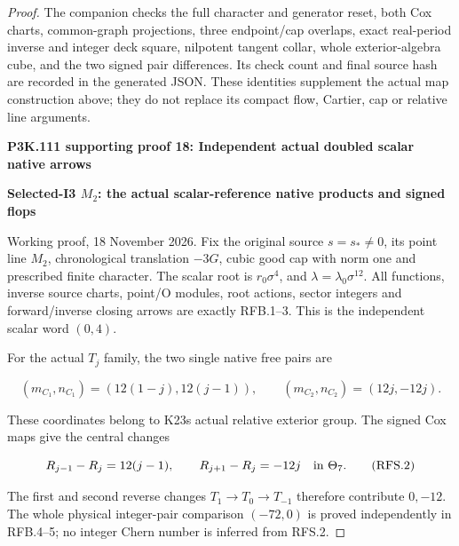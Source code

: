 \begin{proof}
The companion 
checks the full character and generator reset, both Cox charts,
common-graph projections, three endpoint/cap overlaps, exact
real-period inverse and integer deck square, nilpotent tangent
collar, whole exterior-algebra cube, and the two signed pair
differences. Its check count and final source hash are recorded in
the generated JSON. These identities supplement the actual map
construction above; they do not replace its compact flow,
Cartier, cap or relative line arguments.




\par\bigskip\noindent\textbf{P3K.111 supporting proof 18: Independent actual doubled scalar native arrows}\par\nobreak
\par

\medskip\noindent\textbf{Selected-I3 \(M_{2}\): the actual scalar-reference native products and signed flops}

\par\nobreak

Working proof, 18 November 2026. Fix the original source \(s=s_*\ne0\),
its point line \(M_2\), chronological translation \(-3G\), cubic
good cap with norm one and prescribed finite character. The scalar
root is \(r_0\sigma^4\), and \(\lambda=\lambda_0\sigma^{12}\).
All functions, inverse source charts, point/O modules, root actions,
sector integers and forward/inverse closing arrows are exactly
RFB.1--3. This is the independent scalar word \((0,4)\).

For the actual \(T_j\) family, the two single native free pairs are

\[
 (m_{C_1},n_{C_1})=(12(1-j),12(j-1)),\qquad
 (m_{C_2},n_{C_2})=(12j,-12j).
 \tag{RFS.1}
\]

These coordinates belong to K23\textquotesingle s actual relative exterior group.
The signed Cox maps give the central changes

\[
 R_{j-1}-R_j=12(j-1),\qquad R_{j+1}-R_j=-12j
                       \quad\hbox{in }\Theta_7.
 \tag{RFS.2}
\]

The first and second reverse changes \(T_1\to T_0\to T_{-1}\)
therefore contribute \(0,-12\). The whole physical integer-pair
comparison \((-72,0)\) is proved independently in RFB.4--5; no
integer Chern number is inferred from RFS.2.


\end{proof}

